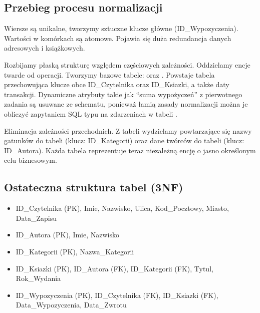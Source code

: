 \documentclass[letterpaper,10pt,english]{sphinxmanual}
\begin{document}
\subsection{Przebieg procesu normalizacji}
\label{\detokenize{rozdzial_3/index:przebieg-procesu-normalizacji}}
\sphinxAtStartPar
{}
Wiersze są unikalne, tworzymy sztuczne klucze główne (ID\_Wypozyczenia). Wartości w komórkach są atomowe. Pojawia się duża redundancja danych adresowych i książkowych.

\sphinxAtStartPar
{}
Rozbijamy płaską strukturę względem częściowych zależności. Oddzielamy encje twarde od operacji.
Tworzymy bazowe tabele:  oraz . Powstaje tabela  przechowująca klucze obce ID\_Czytelnika oraz ID\_Ksiazki, a także daty transakcji.
 Dynamiczne atrybuty takie jak “suma wypożyczeń” z pierwotnego zadania są usuwane ze schematu, ponieważ łamią zasady normalizacji \textendash{} można je obliczyć zapytaniem SQL typu  na zdarzeniach w tabeli .

\sphinxAtStartPar
{}
Eliminacja zależności przechodnich. Z tabeli  wydzielamy powtarzające się nazwy gatunków do tabeli  (klucz: ID\_Kategorii) oraz dane twórców do tabeli  (klucz: ID\_Autora). Każda tabela reprezentuje teraz niezależną encję o jasno określonym celu biznesowym.


\subsection{Ostateczna struktura tabel (3NF)}
\label{\detokenize{rozdzial_3/index:ostateczna-struktura-tabel-3nf}}\begin{itemize}
\item {} 
\sphinxAtStartPar
{} ID\_Czytelnika (PK), Imie, Nazwisko, Ulica, Kod\_Pocztowy, Miasto, Data\_Zapisu

\item {} 
\sphinxAtStartPar
{} ID\_Autora (PK), Imie, Nazwisko

\item {} 
\sphinxAtStartPar
{} ID\_Kategorii (PK), Nazwa\_Kategorii

\item {} 
\sphinxAtStartPar
{} ID\_Ksiazki (PK), ID\_Autora (FK), ID\_Kategorii (FK), Tytul, Rok\_Wydania

\item {} 
\sphinxAtStartPar
{} ID\_Wypozyczenia (PK), ID\_Czytelnika (FK), ID\_Ksiazki (FK), Data\_Wypozyczenia, Data\_Zwrotu

\end{itemize}
\end{document}
